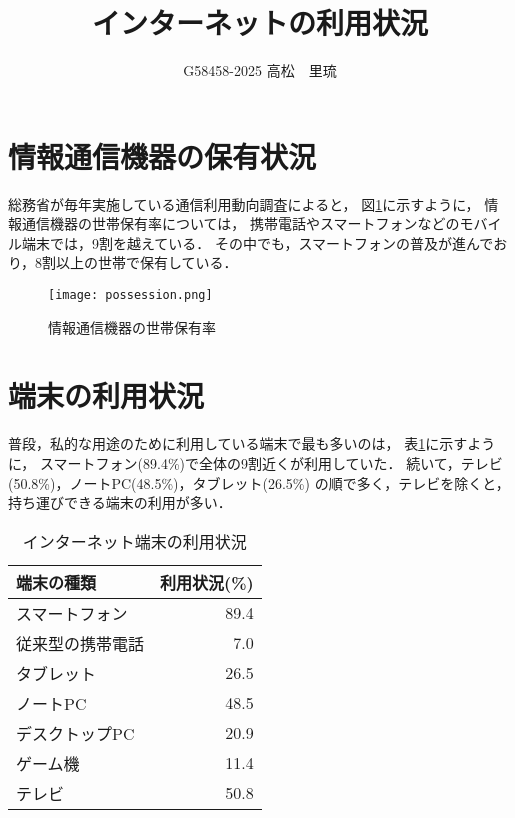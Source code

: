 \documentclass[a4paper,11pt,dvipdfmx]{ujarticle}
\title{インターネットの利用状況}
\author{G58458-2025 高松　里琉}
\begin{document}
\maketitle

\section{情報通信機器の保有状況}

総務省が毎年実施している通信利用動向調査\cite{soumu}によると，
図\ref{fig:保有率}に示すように，
情報通信機器の世帯保有率については，
携帯電話やスマートフォンなどのモバイル端末では，9割を越えている．
その中でも，スマートフォンの普及が進んでおり，8割以上の世帯で保有している．

\begin{figure}[htbp]
    \centering
    \texttt{[image: possession.png]}
    \caption{情報通信機器の世帯保有率}\label{fig:保有率}
\end{figure}

\section{端末の利用状況}

普段，私的な用途のために利用している端末で最も多いのは，
表\ref{tbl:利用状況}に示すように，
スマートフォン(89.4\%)で全体の9割近くが利用していた．
続いて，テレビ(50.8\%)，ノートPC(48.5\%)，タブレット(26.5\%)
の順で多く，テレビを除くと，持ち運びできる端末の利用が多い\cite{corona}．

\begin{table}[htbp]
    \centering
    \caption{インターネット端末の利用状況}
    \label{tbl:利用状況}

    \begin{tabular}{|l|r|}\hline
        端末の種類 & 利用状況(\%) \\
        \hline
        スマートフォン & 89.4 \\
        \hline
        従来型の携帯電話 & 7.0 \\
        \hline
        タブレット & 26.5 \\
        \hline
        ノートPC & 48.5 \\
        \hline
        デスクトップPC & 20.9 \\
        \hline
        ゲーム機 & 11.4 \\
        \hline 
        テレビ & 50.8 \\
        \hline
    \end{tabular}
\end{table}
\end{document}
